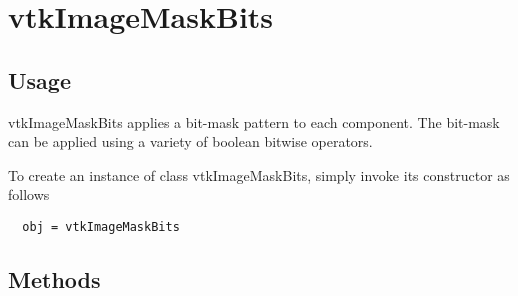 \section{vtkImageMaskBits}

\subsection{Usage}

 vtkImageMaskBits applies a bit-mask pattern to each component.  The
 bit-mask can be applied using a variety of boolean bitwise operators.

To create an instance of class vtkImageMaskBits, simply
invoke its constructor as follows
\begin{verbatim}
  obj = vtkImageMaskBits
\end{verbatim}
\subsection{Methods}

